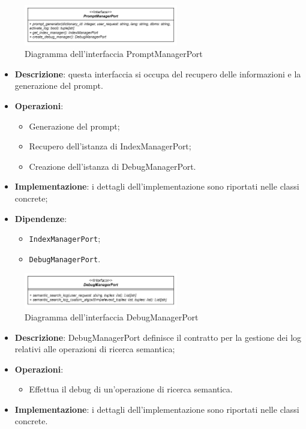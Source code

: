  \label{PromptManagerPort}
\begin{figure}[H]
    \centering
    \includegraphics[width=0.6\textwidth]{assets/Backend/prompt_manager_port.png}
    \caption{Diagramma dell'interfaccia PromptManagerPort}
  \end{figure}
\begin{itemize}
    \item \textbf{Descrizione}: questa interfaccia si occupa del recupero delle informazioni e la generazione del prompt.
    \item \textbf{Operazioni}:
    \begin{itemize}
      \item Generazione del prompt;
      \item Recupero dell'istanza di IndexManagerPort;
      \item Creazione dell'istanza di DebugManagerPort.
    \end{itemize}
    \item \textbf{Implementazione}: i dettagli dell'implementazione sono riportati nelle classi concrete;
    \item \textbf{Dipendenze}:
    \begin{itemize}
        \item \texttt{IndexManagerPort};
        \item \texttt{DebugManagerPort}.
    \end{itemize}
\end{itemize} 

 \label{DebugManagerPort}
\begin{figure}[H]
    \centering
    \includegraphics[width=0.6\textwidth]{assets/Backend/debug_manager_port.png}
    \caption{Diagramma dell'interfaccia DebugManagerPort}
  \end{figure}
\begin{itemize}
    \item \textbf{Descrizione}: DebugManagerPort definisce il contratto per la gestione dei log relativi alle operazioni di ricerca semantica;
    \item \textbf{Operazioni}:
    \begin{itemize}
      \item Effettua il debug di un'operazione di ricerca semantica.
    \end{itemize}
    \item \textbf{Implementazione}: i dettagli dell'implementazione sono riportati nelle classi concrete.
\end{itemize}  

